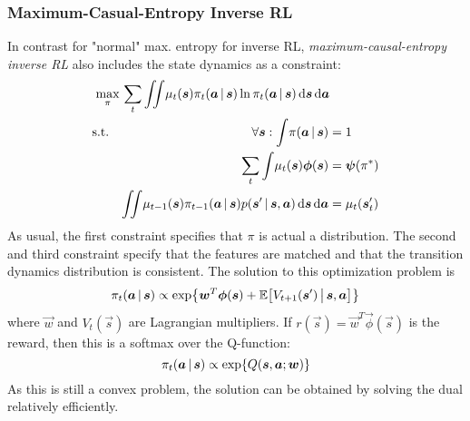 			\subsubsection{Maximum-Casual-Entropy Inverse RL}
				In contrast for "normal" max. entropy for inverse RL, \emph{maximum-causal-entropy inverse RL} also includes the state dynamics as a constraint:
				\begin{equation*}
					\begin{aligned}
						\max_\pi \,& \sum_t \iint\! \mu_t(\bm{s}) \pi_t(\bm{a} \,\vert\, \bm{s}) \ln \pi_t(\bm{a} \,\vert\, \bm{s}) \dd{\bm{s}} \dd{\bm{a}} \\
						\mathrm{s.t.} \quad&
							\begin{aligned}[t]
								\forall \bm{s} : \int\! \pi(\bm{a} \,\vert\, \bm{s}) &= 1 \\
								\sum_t \int\! \mu_t(\bm{s}) \bm{\phi}(\bm{s}) &= \bm{\psi}(\pi^\ast) \\
								\iint\! \mu_{t - 1}(\bm{s}) \pi_{t - 1}(\bm{a} \,\vert\, \bm{s}) p(\bm{s}' \,\vert\, \bm{s}, \bm{a}) \dd{\bm{s}} \dd{\bm{a}} &= \mu_t(\bm{s}_t')
							\end{aligned}
					\end{aligned}
				\end{equation*}
				As usual, the first constraint specifies that \(\pi\) is actual a distribution. The second and third constraint specify that the features are matched and that the transition dynamics distribution is consistent. The solution to this optimization problem is
				\begin{equation*}
					\pi_t(\bm{a} \,\vert\, \bm{s}) \propto \exp{ \bm{w}^T \bm{\phi}(\bm{s}) + \mathbb{E}\big[ V_{t + 1}(\bm{s}') \,\big\vert\,\bm{s}, \bm{a} \big] }
				\end{equation*}
				where \( \vec{w} \) and \( V_t(\vec{s}) \) are Lagrangian multipliers. If \( r(\vec{s}) = \vec{w}^T \vec{\phi}(\vec{s}) \) is the reward, then this is a softmax over the Q-function:
				\begin{equation*}
					\pi_t(\bm{a} \,\vert\, \bm{s}) \propto \exp{ Q(\bm{s}, \bm{a}; \bm{w}) }
				\end{equation*}
				As this is still a convex problem, the solution can be obtained by solving the dual relatively efficiently.

